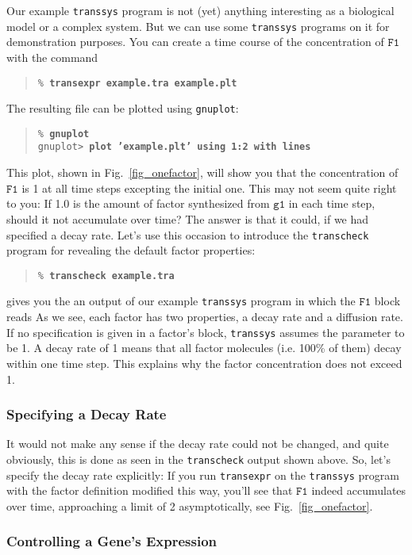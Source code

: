 \documentclass[12pt]{article}
\newcommand{\transsys}{\texttt{transsys}}
\newcommand{\factorsym}[1]{\ensuremath{\mathtt{#1}}}
\newcommand{\genesym}[1]{\ensuremath{\mathtt{#1}}}
\newcommand{\prgname}[1]{\texttt{#1}}
\newcommand{\cmdline}[2][\% ]{\texttt{#1\textbf{#2}}}
\begin{document}
Our example \transsys{} program is not (yet) anything interesting as a
biological model or a complex system. But we can use some \transsys{}
programs on it for demonstration purposes. You can create a time
course of the concentration of \factorsym{F1} with the command
\begin{quote}
\cmdline{transexpr example.tra example.plt}
\end{quote}
The resulting file can be plotted using \prgname{gnuplot}:
\begin{quote}
\cmdline{gnuplot} \\
\cmdline[gnuplot> ]{plot 'example.plt' using 1:2 with lines}
\end{quote}
This plot, shown in Fig.\ \ref{fig_onefactor}, will show you that
the concentration of \factorsym{F1} is 1 at all time steps excepting
the initial one. This may not seem quite right to you: If 1.0 is the
amount of factor synthesized from \genesym{g1} in each time step,
should it not accumulate over time? The answer is that it could, if we
had specified a decay rate. Let's use this occasion to introduce the
\prgname{transcheck} program for revealing the default factor
properties:
\begin{quote}
\cmdline{transcheck example.tra}
\end{quote}
gives you the an output of our example \transsys{} program in which
the \factorsym{F1} block reads
As we see, each factor has two properties, a decay rate and a
diffusion rate. If no specification is given in a factor's block,
\transsys{} assumes the parameter to be 1.  A decay rate of 1 means
that all factor molecules (i.e. 100\% of them) decay within one time
step. This explains why the factor concentration does not exceed 1.


\subsubsection{Specifying a Decay Rate}

It would not make any sense if the decay rate could not be changed,
and quite obviously, this is done as seen in the \prgname{transcheck}
output shown above. So, let's specify the decay rate explicitly:
If you run \prgname{transexpr} on the \transsys{} program with the
factor definition modified this way, you'll see that \factorsym{F1}
indeed accumulates over time, approaching a limit of 2
asymptotically, see Fig.\ \ref{fig_onefactor}.


\subsubsection{Controlling a Gene's Expression}
\end{document}
